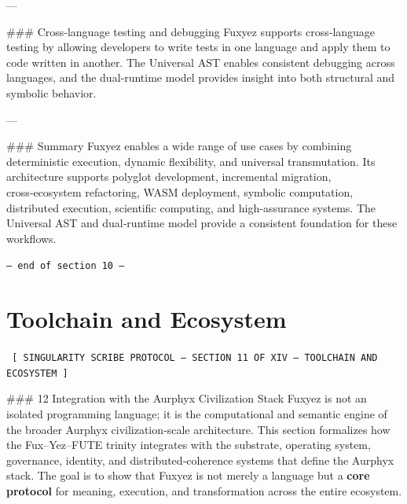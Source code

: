 \begin{enumerate}
---

\#\#\# Cross‑language testing and debugging  
Fuxyez supports cross‑language testing by allowing developers to write tests in one language and apply them to code written in another. The Universal AST enables consistent debugging across languages, and the dual‑runtime model provides insight into both structural and symbolic behavior.

---

\#\#\# Summary  
Fuxyez enables a wide range of use cases by combining deterministic execution, dynamic flexibility, and universal transmutation. Its architecture supports polyglot development, incremental migration, cross‑ecosystem refactoring, WASM deployment, symbolic computation, distributed execution, scientific computing, and high‑assurance systems. The Universal AST and dual‑runtime model provide a consistent foundation for these workflows.
    
    \vspace{1cm}
    \begin{center}
    \color{alienPurple}\texttt{--- end of section 10 ---}
    \end{center}
    \clearpage
    

    \chapter*{Toolchain and Ecosystem}
    
    
    \begin{glyphbox}
    \centering
    \color{neonCyan}\fontsize{8}{10}\selectfont\texttt{
    [ SINGULARITY SCRIBE PROTOCOL -- SECTION 11 OF XIV -- TOOLCHAIN AND ECOSYSTEM ]
    }
    \end{glyphbox}
    \vspace{0.3cm}
    
    
    \#\#\# 12 Integration with the Aurphyx Civilization Stack  
Fuxyez is not an isolated programming language; it is the computational and semantic engine of the broader Aurphyx civilization‑scale architecture. This section formalizes how the Fux–Yez–FUTE trinity integrates with the substrate, operating system, governance, identity, and distributed‑coherence systems that define the Aurphyx stack. The goal is to show that Fuxyez is not merely a language but a \textbf{core protocol} for meaning, execution, and transformation across the entire ecosystem.


\end{enumerate}
